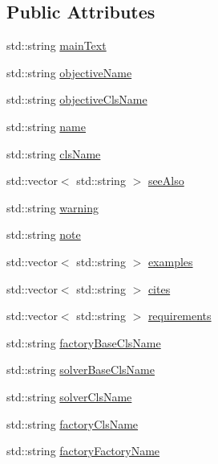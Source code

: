 \subsection*{Public Attributes}
\begin{DoxyCompactItemize}
\item 
std\+::string \hyperlink{classnifty_1_1graph_1_1opt_1_1SolverDocstringHelper_af6d975013abb27ff2354f287e4b79374}{main\+Text}
\item 
std\+::string \hyperlink{classnifty_1_1graph_1_1opt_1_1SolverDocstringHelper_acec6d9e65ee9883ff743e8c3f1384ccb}{objective\+Name}
\item 
std\+::string \hyperlink{classnifty_1_1graph_1_1opt_1_1SolverDocstringHelper_a8b11107585932aee2c87002c92dee981}{objective\+Cls\+Name}
\item 
std\+::string \hyperlink{classnifty_1_1graph_1_1opt_1_1SolverDocstringHelper_a6734cbc08a1ab468ca1c44994b6b8a19}{name}
\item 
std\+::string \hyperlink{classnifty_1_1graph_1_1opt_1_1SolverDocstringHelper_af93a4e132b19379755185c3608e5de83}{cls\+Name}
\item 
std\+::vector$<$ std\+::string $>$ \hyperlink{classnifty_1_1graph_1_1opt_1_1SolverDocstringHelper_a720cdd81a1d1d98e285e908e4d8940e8}{see\+Also}
\item 
std\+::string \hyperlink{classnifty_1_1graph_1_1opt_1_1SolverDocstringHelper_ae4909ec00e9e8fe3b4b44f05479c8d0e}{warning}
\item 
std\+::string \hyperlink{classnifty_1_1graph_1_1opt_1_1SolverDocstringHelper_a2d62927611f4c6056c475d1239b0f9a4}{note}
\item 
std\+::vector$<$ std\+::string $>$ \hyperlink{classnifty_1_1graph_1_1opt_1_1SolverDocstringHelper_a541b976a3991f73c57138a20f33b0846}{examples}
\item 
std\+::vector$<$ std\+::string $>$ \hyperlink{classnifty_1_1graph_1_1opt_1_1SolverDocstringHelper_a85adbc6abb5ebde8729f1acc455ec964}{cites}
\item 
std\+::vector$<$ std\+::string $>$ \hyperlink{classnifty_1_1graph_1_1opt_1_1SolverDocstringHelper_afc7ab5655344192a9c4062bd03757272}{requirements}
\item 
std\+::string \hyperlink{classnifty_1_1graph_1_1opt_1_1SolverDocstringHelper_a1a30308868b53f70281d1be2867737c3}{factory\+Base\+Cls\+Name}
\item 
std\+::string \hyperlink{classnifty_1_1graph_1_1opt_1_1SolverDocstringHelper_a51b9e4b83ca0017fca66e341864b6dd0}{solver\+Base\+Cls\+Name}
\item 
std\+::string \hyperlink{classnifty_1_1graph_1_1opt_1_1SolverDocstringHelper_a54b79bf8a8b0f859c4afb279d05d33a3}{solver\+Cls\+Name}
\item 
std\+::string \hyperlink{classnifty_1_1graph_1_1opt_1_1SolverDocstringHelper_a9c38695a3ab30f4d6022a3808b894699}{factory\+Cls\+Name}
\item 
std\+::string \hyperlink{classnifty_1_1graph_1_1opt_1_1SolverDocstringHelper_ab4bccf7e63a33d8421528fa3cd993b8a}{factory\+Factory\+Name}
\end{DoxyCompactItemize}



